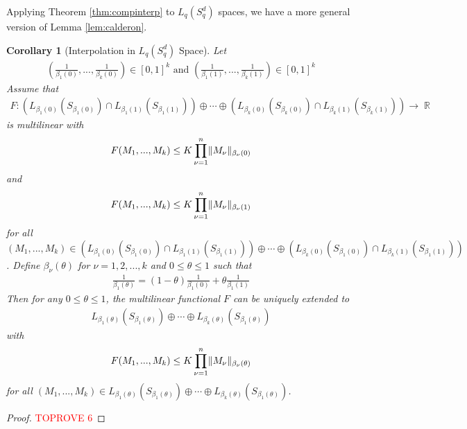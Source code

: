 \documentclass[11pt]{amsart}
\numberwithin{equation}{section}
\numberwithin{equation}{section}
\DeclareMathOperator{\R}{\mathbb{R}}
\DeclarePairedDelimiter{\norm}{\lVert}{\rVert}
\newtheorem{corollary}[theorem]{Corollary}
\theoremstyle{remark}
\theoremstyle{definition}
\begin{document}
Applying Theorem \ref{thm:compinterp} to $L_q(S_q^d)$ spaces, we have a more general version of Lemma \ref{lem:calderon}.
\begin{corollary}[Interpolation in $L_q(S_q^d)$ Space]\label{cor:spinterpo}
    Let\begin{align*}(\frac{1}{\beta_{1}(0)},...,\frac{1}{\beta_{k}(0)}) \in [0,1]^k \text{ and }(\frac{1}{\beta_{1}(1)},...,\frac{1}{\beta_{k}(1)}) \in [0,1]^k\end{align*} Assume that
    \begin{align*}
        F: (L_{\beta_{1}(0)}(S_{\beta_{1}(0)}) \cap L_{\beta_{1}(1)}(S_{\beta_{1}(1)})) \oplus \cdots \oplus (L_{\beta_{k}(0)}(S_{\beta_{k}(0)}) \cap L_{\beta_{k}(1)}(S_{\beta_{k}(1)})) \to \R
    \end{align*}
    is multilinear with
    \begin{align*}
        F(M_1,...,M_k) \le K \prod \limits_{\nu=1}^{n} \norm{M_{\nu}}_{\beta_{\nu}(0)}
    \end{align*}
    and
    \begin{align*}
        F(M_1,...,M_k) \le K \prod \limits_{\nu=1}^{n} \norm{M_{\nu}}_{\beta_{\nu}(1)}
    \end{align*}
    for all $(M_1,...,M_k) \in (L_{\beta_{1}(0)}(S_{\beta_{1}(0)}) \cap L_{\beta_{1}(1)}(S_{\beta_{1}(1)})) \oplus \cdots \oplus (L_{\beta_{k}(0)}(S_{\beta_{1}(0)}) \cap L_{\beta_{k}(1)}(S_{\beta_{1}(1)}))$.
Define $\beta_{\nu}(\theta)$ for $\nu=1,2,...,k$  and $0 \le \theta \le 1$ such that
\begin{align*}
    \frac{1}{\beta_{1}(\theta)}=(1-\theta)\frac{1}{\beta_{1}(0)}+\theta \frac{1}{\beta_{1}(1)}
\end{align*}
    Then for any $0 \le \theta \le 1$, the multilinear functional $F$ can be uniquely extended to \begin{align*}L_{\beta_{1}(\theta)}(S_{\beta_{1}(\theta)})  \oplus \cdots \oplus L_{\beta_{k}(\theta)}(S_{\beta_{1}(\theta)}) \end{align*} with
    \begin{align*}
        F(M_1,...,M_k) \le K \prod \limits_{\nu=1}^{n} \norm{M_{\nu}}_{\beta_{\nu}(\theta)}
    \end{align*}
    for all $(M_1,...,M_k) \in L_{\beta_{1}(\theta)}(S_{\beta_{1}(\theta)})  \oplus \cdots \oplus L_{\beta_{k}(\theta)}(S_{\beta_{1}(\theta)}) $.
\end{corollary}
\begin{proof}\textcolor{red}{TOPROVE 6}\end{proof}
\end{document}
